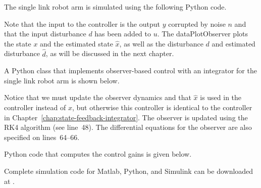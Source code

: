 The single link robot arm is simulated using the following Python code.

Note that the input to the controller is the output $y$ corrupted by noise $n$ and that the input disturbance $d$ has been added to $u$.  The dataPlotObserver plots the state $x$ and the estimated state $\hat{x}$, as well as the disturbance $d$ and estimated disturbance $\hat{d}$, as will be discussed in the next chapter.  

A Python class that implements observer-based control with an integrator for the single link robot arm is shown below.

Notice that we must update the observer dynamics and that $\hat{x}$ is used in the controller instead of $x$, but otherwise this controller is identical to the controller in Chapter~\ref{chap:state-feedback-integrator}.  The observer is updated using the RK4 algorithm (see line~48).  The differential equations for the observer are also specified on lines~64--66.  

Python code that computes the control gains is given below.


Complete simulation code for Matlab, Python, and Simulink can be downloaded at .
